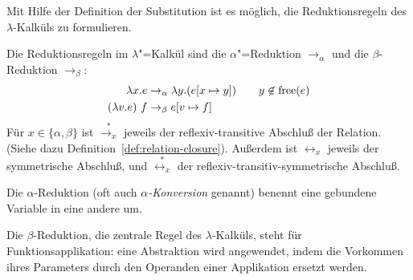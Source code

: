 Mit Hilfe der Definition der Substitution ist es möglich,
die Reduktionsregeln des $\lambda$-Kalküls zu formulieren. 
%
\begin{definition}[Reduktionsregeln]
  Die Reduktionsregeln im $\lambda$"=Kalkül sind
  die $\alpha$"=Reduktion $\rightarrow_{\alpha}$ und die
  $\beta$-Reduktion $\rightarrow_{\beta}$:%
  \begin{alignat*}{2}
    \lambda x.e & \rightarrow_{\alpha} \lambda y.(e[x\mapsto y]) \quad 
    & y\not\in\operatorname{free}(e)
    \\
    (\lambda v.e)~f & \rightarrow_{\beta} e[v\mapsto f]
  \end{alignat*}
  Für $x\in\{\alpha,\beta\}$ ist $\overset{\ast}{\rightarrow_x}$
  jeweils der reflexiv-transitive Abschluß der Relation.  (Siehe dazu
  Definition~\ref{def:relation-closure}). %
  Außerdem ist
  $\leftrightarrow_x$ jeweils der symmetrische Abschluß, und
  $\overset{\ast}{\leftrightarrow_x}$ der
  reflexiv-transitiv-symmetrische Abschluß.
\end{definition}
%
Die $\alpha$-Reduktion (oft auch \textit{$\alpha$-Konversion} genannt)
benennt eine gebundene Variable in eine andere um.

Die $\beta$-Reduktion, die zentrale Regel des $\lambda$-Kalküls, steht für
Funktionsapplikation: eine Abstraktion
wird angewendet, indem die Vorkommen ihres Parameters durch den
Operanden einer Applikation ersetzt werden.


